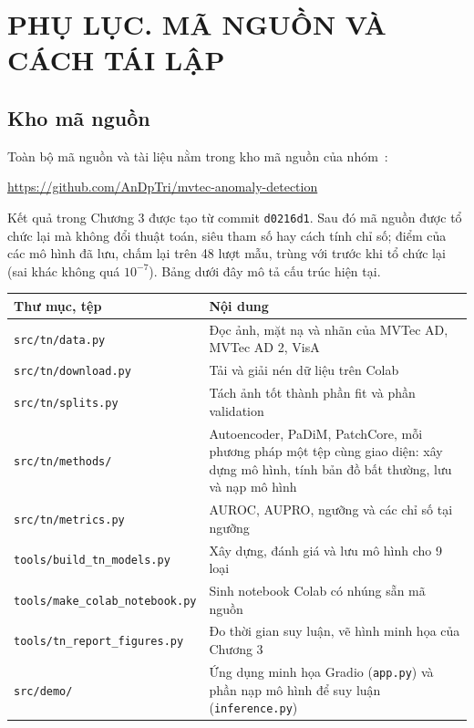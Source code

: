 \chapter*{PHỤ LỤC. MÃ NGUỒN VÀ CÁCH TÁI LẬP}

\section*{Kho mã nguồn}

Toàn bộ mã nguồn và tài liệu nằm trong kho mã nguồn của nhóm~\cite{nhom13MVTecAnomalyDetection2026}:
\begin{center}
  \url{https://github.com/AnDpTri/mvtec-anomaly-detection}
\end{center}
Kết quả trong Chương 3 được tạo từ commit \texttt{d0216d1}. Sau đó mã nguồn được tổ chức lại mà không đổi thuật toán,
siêu tham số hay cách tính chỉ số; điểm của các mô hình đã lưu, chấm lại trên 48 lượt mẫu, trùng với trước khi tổ chức
lại (sai khác không quá $10^{-7}$). Bảng dưới đây mô tả cấu trúc hiện tại.

\begin{table}[htbp]
  \centering
  \small
  \begin{tabular}{@{}>{\raggedright\arraybackslash}p{6.1cm} >{\raggedright\arraybackslash}p{8.3cm}@{}}
    \toprule
    Thư mục, tệp & Nội dung \\
    \midrule
    \texttt{src/tn/data.py} & Đọc ảnh, mặt nạ và nhãn của MVTec AD, MVTec AD 2, VisA \\
    \texttt{src/tn/download.py} & Tải và giải nén dữ liệu trên Colab \\
    \texttt{src/tn/splits.py} & Tách ảnh tốt thành phần fit và phần validation \\
    \texttt{src/tn/methods/} & Autoencoder, PaDiM, PatchCore, mỗi phương pháp một tệp cùng giao diện: xây dựng mô hình, tính bản đồ bất thường, lưu và nạp mô hình \\
    \texttt{src/tn/metrics.py} & AUROC, AUPRO, ngưỡng và các chỉ số tại ngưỡng \\
    \texttt{tools/build\_tn\_models.py} & Xây dựng, đánh giá và lưu mô hình cho 9 loại \\
    \texttt{tools/make\_colab\_notebook.py} & Sinh notebook Colab có nhúng sẵn mã nguồn \\
    \texttt{tools/tn\_report\_figures.py} & Đo thời gian suy luận, vẽ hình minh họa của Chương 3 \\
    \texttt{src/demo/} & Ứng dụng minh họa Gradio (\texttt{app.py}) và phần nạp mô hình để suy luận (\texttt{inference.py}) \\
    \bottomrule
  \end{tabular}
\end{table}


